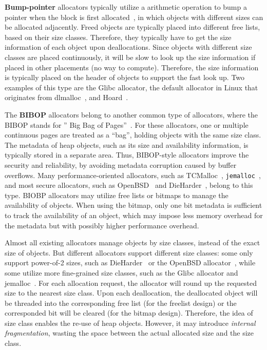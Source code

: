 \textbf{Bump-pointer} allocators typically utilize a  arithmetic operation to bump a pointer when the block is first allocated~\cite{Cling}, in which objects with different sizes can be allocated adjacently. Freed objects are typically placed into different free lists, based on their size classes.  Therefore, they typically have to get the size information of each object upon deallocations. Since objects with different size classes are placed continuously, it will be slow to look up the size information if placed in other placements (no way to compute). Therefore, the size information is typically placed on the header of objects to support the fast look up.  Two examples of this type are the Glibc allocator, the default allocator in Linux that originates from dlmalloc~\cite{dlmalloc}, and Hoard~\cite{Hoard}.  

The \textbf{BIBOP} allocators belong to another common type of allocators, where the BIBOP stands for '' Big Bag of Pages''~\cite{hanson1980}. For these allocators, one or multiple continuous pages are treated as a ``bag'', holding objects with the same size class. The metadata of heap objects, such as its size and availability information, is typically stored in a separate area. Thus, BIBOP-style allocators improve the security and reliability, by avoiding metadata corruption caused by buffer overflows. Many performance-oriented allocators, such as TCMalloc~\cite{TCMalloc}, \texttt{jemalloc}~\cite{jemalloc}, and most secure allocators, such as OpenBSD~\cite{OpenBSD} and DieHarder~\cite{DieHarder}, belong to this type. BIOBP allocators may utilize free lists or bitmaps to manage the availability of objects. When using the bitmap, only one bit metadata is sufficient to track the availability of an object, which may impose less memory overhead for the metadata but with possibly higher performance overhead.  


Almost all existing allocators manage objects by  size classes, instead of the exact size of objects. But different allocators support  different size classes: some only support power-of-2 sizes, such as DieHarder~\cite{DieHarder} or the OpenBSD allocator~\cite{OpenBSD}, while some utilize more fine-grained size classes, such as the Glibc allocator and jemalloc~\cite{jemalloc}. For each allocation request, the allocator will round up the requested size to the nearest size class. Upon each deallocation, the deallocated object will be threaded into the corresponding free list (for the freelist design) or the corresponded bit will be cleared (for the bitmap design). Therefore, the idea of size class enables the re-use of heap objects. However, it may introduce \textit{internal fragmentation}, wasting the space between the actual allocated size and the size class. 

